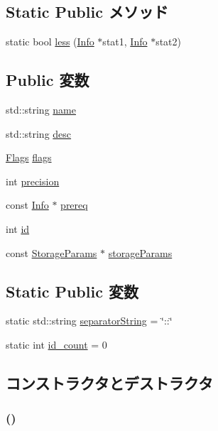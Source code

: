 \subsection*{Static Public メソッド}
\begin{DoxyCompactItemize}
\item 
static bool \hyperlink{classStats_1_1Info_a18124663e275538807e057c989ef2a3a}{less} (\hyperlink{classStats_1_1Info}{Info} $\ast$stat1, \hyperlink{classStats_1_1Info}{Info} $\ast$stat2)
\end{DoxyCompactItemize}
\subsection*{Public 変数}
\begin{DoxyCompactItemize}
\item 
std::string \hyperlink{classStats_1_1Info_a9b45b3e13bd9167aab02e17e08916231}{name}
\item 
std::string \hyperlink{classStats_1_1Info_a378e4473b8cd1fccf534804887f2bc85}{desc}
\item 
\hyperlink{classFlags}{Flags} \hyperlink{classStats_1_1Info_aa991e2b209ef26272bf4fd920777bcda}{flags}
\item 
int \hyperlink{classStats_1_1Info_aa95455ed52a8459fad69509a4a0411b5}{precision}
\item 
const \hyperlink{classStats_1_1Info}{Info} $\ast$ \hyperlink{classStats_1_1Info_ab085d73a3716bb962a1fa584dd66d1b1}{prereq}
\item 
int \hyperlink{classStats_1_1Info_a7441ef0865bcb3db9b8064dd7375c1ea}{id}
\item 
const \hyperlink{structStats_1_1StorageParams}{StorageParams} $\ast$ \hyperlink{classStats_1_1Info_ac424134f2732c6004c0f3cdd70e6f354}{storageParams}
\end{DoxyCompactItemize}
\subsection*{Static Public 変数}
\begin{DoxyCompactItemize}
\item 
static std::string \hyperlink{classStats_1_1Info_a8dd294195175788a5d03db3d317a37df}{separatorString} = \char`\"{}::\char`\"{}
\item 
static int \hyperlink{classStats_1_1Info_a22288cef00c8db95e1c16a7e64cc0d73}{id\_\-count} = 0
\end{DoxyCompactItemize}


\subsection{コンストラクタとデストラクタ}
\hypertarget{classStats_1_1Info_ab548dec0fbc3c58026e3030d145bc64e}{
\subsubsection[{Info}]{ ()}}
\label{classStats_1_1Info_ab548dec0fbc3c58026e3030d145bc64e}



